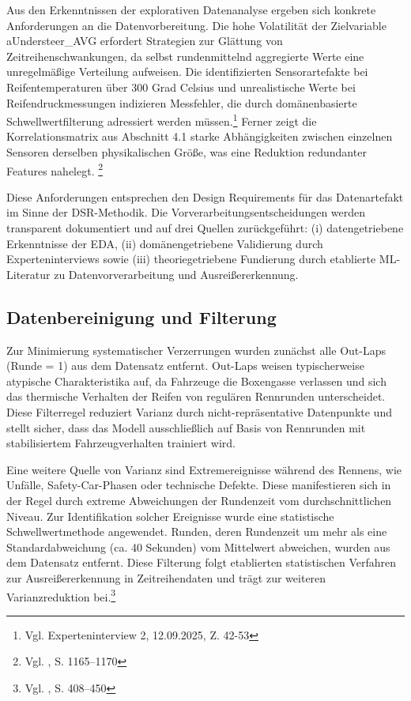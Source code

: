 Aus den Erkenntnissen der explorativen Datenanalyse ergeben sich konkrete Anforderungen an die Datenvorbereitung. Die hohe Volatilität der Zielvariable aUndersteer\_AVG erfordert Strategien zur Glättung von Zeitreihenschwankungen, da selbst rundenmittelnd aggregierte Werte eine unregelmäßige Verteilung aufweisen. Die identifizierten Sensorartefakte bei Reifentemperaturen über 300 Grad Celsius und unrealistische Werte bei Reifendruckmessungen indizieren Messfehler, die durch domänenbasierte Schwellwertfilterung adressiert werden müssen.\footnote{Vgl. Experteninterview 2, 12.09.2025, Z. 42-53} Ferner zeigt die Korrelationsmatrix aus Abschnitt 4.1 starke Abhängigkeiten zwischen einzelnen Sensoren derselben physikalischen Größe, was eine Reduktion redundanter Features nahelegt. \footnote{Vgl. \cite{Guyon2003}, S. 1165–1170}


Diese Anforderungen entsprechen den Design Requirements für das Datenartefakt im Sinne der \ac{DSR}-Methodik. Die Vorverarbeitungsentscheidungen werden transparent dokumentiert und auf drei Quellen zurückgeführt: (i) datengetriebene Erkenntnisse der EDA, (ii) domänengetriebene Validierung durch Experteninterviews sowie (iii) theoriegetriebene Fundierung durch etablierte \ac{ML}-Literatur zu Datenvorverarbeitung und Ausreißererkennung.


\subsection{Datenbereinigung und Filterung}

Zur Minimierung systematischer Verzerrungen wurden zunächst alle Out-Laps (Runde = 1) aus dem Datensatz entfernt. Out-Laps weisen typischerweise atypische Charakteristika auf, da Fahrzeuge die Boxengasse verlassen und sich das thermische Verhalten der Reifen von regulären Rennrunden unterscheidet. Diese Filterregel reduziert Varianz durch nicht-repräsentative Datenpunkte und stellt sicher, dass das Modell ausschließlich auf Basis von Rennrunden mit stabilisiertem Fahrzeugverhalten trainiert wird.

Eine weitere Quelle von Varianz sind Extremereignisse während des Rennens, wie Unfälle, Safety-Car-Phasen oder technische Defekte. Diese manifestieren sich in der Regel durch extreme Abweichungen der Rundenzeit vom durchschnittlichen Niveau. Zur Identifikation solcher Ereignisse wurde eine statistische Schwellwertmethode angewendet. Runden, deren Rundenzeit um mehr als eine Standardabweichung (ca. 40 Sekunden) vom Mittelwert abweichen, wurden aus dem Datensatz entfernt. Diese Filterung folgt etablierten statistischen Verfahren zur Ausreißererkennung in Zeitreihendaten und trägt zur weiteren Varianzreduktion bei.\footnote{Vgl. \cite{Box2015}, S. 408–450}

